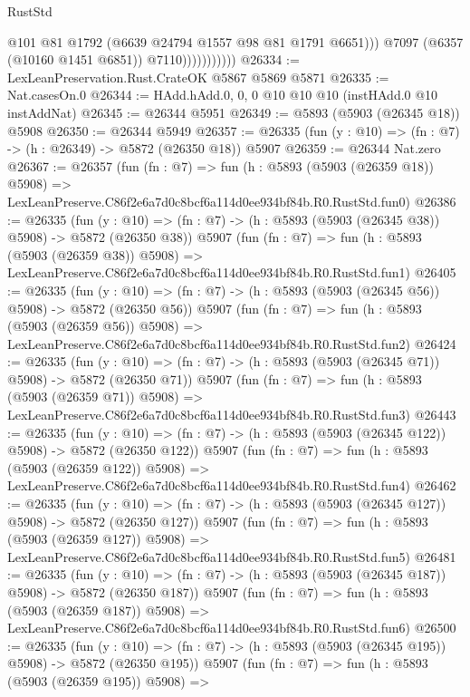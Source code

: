 \begin{lexlean}{RustStd}
\begin{coremodule}
                              @101
                              @81
                              @1792
                              (@6639 @24794 @1557 @98 @81 @1791 @6651)))
                          @7097
                          (@6357 (@10160 @1451 @6851))
                          @7110)))))))))))
@26334 := LexLeanPreservation.Rust.CrateOK @5867 @5869 @5871
@26335 := Nat.casesOn.{0}
@26344 := HAdd.hAdd.{0, 0, 0} @10 @10 @10 (instHAdd.{0} @10 instAddNat)
@26345 := @26344 @5951
@26349 := @5893 (@5903 (@26345 @18)) @5908
@26350 := @26344 @5949
@26357 := @26335 (fun (y : @10) => (fn : @7) -> (h : @26349) -> @5872 (@26350 @18)) @5907
@26359 := @26344 Nat.zero
@26367 := @26357
    (fun (fn : @7) =>
    fun (h : @5893 (@5903 (@26359 @18)) @5908) =>
    LexLeanPreserve.C86f2e6a7d0c8bcf6a114d0ee934bf84b.R0.RustStd.fun0)
@26386 := @26335
    (fun (y : @10) => (fn : @7) -> (h : @5893 (@5903 (@26345 @38)) @5908) -> @5872 (@26350 @38))
    @5907
    (fun (fn : @7) =>
    fun (h : @5893 (@5903 (@26359 @38)) @5908) =>
    LexLeanPreserve.C86f2e6a7d0c8bcf6a114d0ee934bf84b.R0.RustStd.fun1)
@26405 := @26335
    (fun (y : @10) => (fn : @7) -> (h : @5893 (@5903 (@26345 @56)) @5908) -> @5872 (@26350 @56))
    @5907
    (fun (fn : @7) =>
    fun (h : @5893 (@5903 (@26359 @56)) @5908) =>
    LexLeanPreserve.C86f2e6a7d0c8bcf6a114d0ee934bf84b.R0.RustStd.fun2)
@26424 := @26335
    (fun (y : @10) => (fn : @7) -> (h : @5893 (@5903 (@26345 @71)) @5908) -> @5872 (@26350 @71))
    @5907
    (fun (fn : @7) =>
    fun (h : @5893 (@5903 (@26359 @71)) @5908) =>
    LexLeanPreserve.C86f2e6a7d0c8bcf6a114d0ee934bf84b.R0.RustStd.fun3)
@26443 := @26335
    (fun (y : @10) => (fn : @7) -> (h : @5893 (@5903 (@26345 @122)) @5908) -> @5872 (@26350 @122))
    @5907
    (fun (fn : @7) =>
    fun (h : @5893 (@5903 (@26359 @122)) @5908) =>
    LexLeanPreserve.C86f2e6a7d0c8bcf6a114d0ee934bf84b.R0.RustStd.fun4)
@26462 := @26335
    (fun (y : @10) => (fn : @7) -> (h : @5893 (@5903 (@26345 @127)) @5908) -> @5872 (@26350 @127))
    @5907
    (fun (fn : @7) =>
    fun (h : @5893 (@5903 (@26359 @127)) @5908) =>
    LexLeanPreserve.C86f2e6a7d0c8bcf6a114d0ee934bf84b.R0.RustStd.fun5)
@26481 := @26335
    (fun (y : @10) => (fn : @7) -> (h : @5893 (@5903 (@26345 @187)) @5908) -> @5872 (@26350 @187))
    @5907
    (fun (fn : @7) =>
    fun (h : @5893 (@5903 (@26359 @187)) @5908) =>
    LexLeanPreserve.C86f2e6a7d0c8bcf6a114d0ee934bf84b.R0.RustStd.fun6)
@26500 := @26335
    (fun (y : @10) => (fn : @7) -> (h : @5893 (@5903 (@26345 @195)) @5908) -> @5872 (@26350 @195))
    @5907
    (fun (fn : @7) =>
    fun (h : @5893 (@5903 (@26359 @195)) @5908) =>

\end{coremodule}
\end{lexlean}

